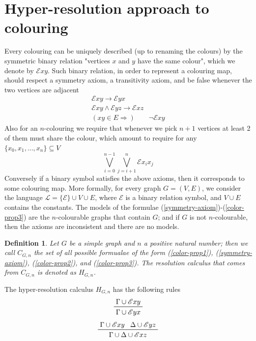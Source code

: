 \documentclass[a4paper,12pt,oneside]{book}
\newtheorem{definition}[theorem]{Definition}
\newcommand{\E}{\mathscr{E}}
\begin{document}
\section{Hyper-resolution approach to colouring}
Every colouring can be uniquely described (up to renaming the colours) by the symmetric binary relation "vertices $x$ and $y$ have the same colour", which we denote by  $\E xy$. 
Such binary relation, in order to represent a colouring map, should respect a symmetry axiom, a transitivity axiom, and be false whenever the two vertices are adjacent 
\begin{gather}
\E xy \rightarrow \E yx \label{symmetry-axiom}\\
\E xy \wedge \E yz \rightarrow  \E xz \label{color-prop1}\\
( xy \in E \Rightarrow ) \qquad  \neg \E xy \label{color-prop2}
\end{gather}
Also for an $n$-colouring we require that whenever we pick $n+1$ vertices at least 2 of them must share the colour, which amount to require for any $\{ x_0, x_1, ... , x_n \} \subseteq  V$
\begin{equation} \label{color-prop3}
\bigvee_{i=0}^{n-1} \bigvee_{j=i+1}^{n} \E x_i x_j
\end{equation}
Conversely if a binary symbol satisfies the above axioms, then it corresponds to some colouring map. More formally, for every graph $G=(V,E)$, we consider the language $\mathscr{L}=\{\E\}\cup V\cup E$, where $\E$ is a binary relation symbol, and $V\cup E$ contains the constants. The models of the formulae (\ref{symmetry-axiom})-(\ref{color-prop3}) are the $n$-colourable graphs that contain $G$; and if $G$ is not $n$-colourable, then  the axioms are inconsistent and there are no models. 
\begin{definition}
Let $G$ be a simple graph and $n$ a positive natural number; then we call $C_{G,n}$ the set of all possible formualae of the form (\ref{color-prop1}), (\ref{symmetry-axiom}), (\ref{color-prop2}), and (\ref{color-prop3}). The resolution calculus that comes from $C_{G,n}$ is denoted as $H_{G,n}$.
\end{definition}
The hyper-resolution calculus $H_{G,n}$ has the following rules
\begin{equation}
\label{symm}
\prftree{\Gamma \cup \E xy }{ \Gamma\cup \E yx }
\end{equation}
\begin{equation}
\label{trans}
 \prftree{\Gamma \cup \E xy }{\Delta \cup \E yz }{\Gamma \cup \Delta \cup \E xz }
\end{equation}
\end{document}
